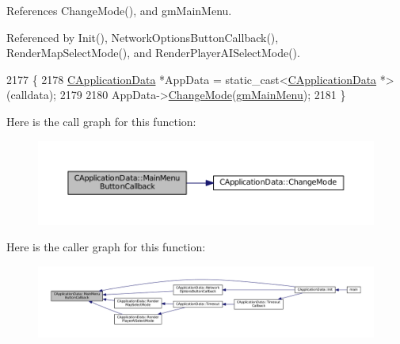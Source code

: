 References Change\+Mode(), and gm\+Main\+Menu.



Referenced by Init(), Network\+Options\+Button\+Callback(), Render\+Map\+Select\+Mode(), and Render\+Player\+A\+I\+Select\+Mode().


\begin{DoxyCode}
2177                                                            \{
2178     \hyperlink{classCApplicationData}{CApplicationData} *AppData = \textcolor{keyword}{static\_cast<}\hyperlink{classCApplicationData}{CApplicationData} *\textcolor{keyword}{>}(calldata);
2179     
2180     AppData->\hyperlink{classCApplicationData_aee18c113e9a0acb3cad3d63eb19de71b}{ChangeMode}(\hyperlink{classCApplicationData_ac8ac37a4c8bb871036fbbdc6a072e403ad2500485f81c2bf3c1814a969082783b}{gmMainMenu});
2181 \}
\end{DoxyCode}
Here is the call graph for this function\+:\nopagebreak
\begin{figure}[H]
\begin{center}
\leavevmode
\includegraphics[width=350pt]{classCApplicationData_a4410839118b5b74dab798ad7be6f703b_cgraph}
\end{center}
\end{figure}
Here is the caller graph for this function\+:\nopagebreak
\begin{figure}[H]
\begin{center}
\leavevmode
\includegraphics[width=350pt]{classCApplicationData_a4410839118b5b74dab798ad7be6f703b_icgraph}
\end{center}
\end{figure}
\hypertarget{classCApplicationData_a7abef8a548d0ad3adb70f11d8a74176c}{}\label{classCApplicationData_a7abef8a548d0ad3adb70f11d8a74176c} 
